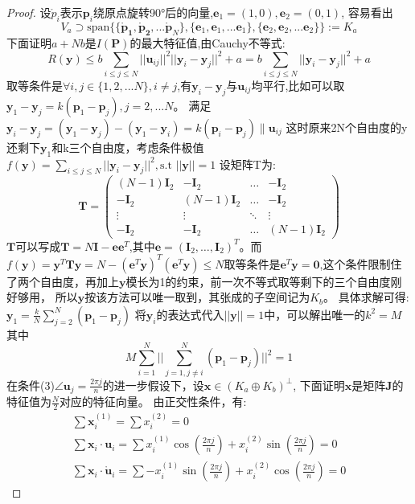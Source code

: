 \begin{proof}
设$\mathring{p}_i$表示$\bm{p}_i$绕原点旋转90°后的向量,$\bm{e}_1=(1,0),\bm{e}_2=(0,1)$,
容易看出
\[
V_a \supset\text{span}\{\{\bm{\mathring{p}_1},\bm{\mathring{p}_2},...\bm{\mathring{p}} _N\},\{\bm{e}_1,\bm{e}_1,...\bm{e}_1\},\{\bm{e}_2,\bm{e}_2,...\bm{e}_2\}\}:=K_a
\]
下面证明$a+Nb$是$I(\bm{P})$的最大特征值,由Cauchy不等式:
\begin{equation}
R(\bm{y})\leq b\sum_{i\leq j\leq N} ||\bm{u}_{ij}||^2||\bm{y}_i-\bm{y}_j||^2+a=b\sum_{i\leq j\leq N}||\bm{y}_i-\bm{y}_j||^2+a
\end{equation}
取等条件是$\forall i,j\in \{1,2,...N\},i\neq j$,有$\bm{y}_i-\bm{y}_j$与$\bm{u}_{ij}$均平行,比如可以取
$\bm{y}_1-\bm{y}_j=k(\bm{p}_1-\bm{p}_j),j=2,...N$。
满足
$\bm{y}_i-\bm{y}_j=(\bm{y}_1-\bm{y}_j)-(\bm{y}_1-\bm{y}_i)
=k(\bm{p}_i-\bm{p}_j)\parallel \bm{u}_{ij}$
这时原来2N个自由度的y还剩下$\bm{y}_1$和k三个自由度，考虑条件极值
$f(\bm{y})=\sum_{i\leq j\leq N} ||\bm{y}_i-\bm{y}_j||^2,\text{s.t } ||\bm{y}||=1$
设矩阵T为:
\[
\bm{T}=\left(
\begin{array}{cccc}
(N-1)\bm{I}_2&-\bm{I}_2&\dots&-\bm{I}_2\\
-\bm{I}_2&(N-1)\bm{I}_2&\dots&-\bm{I}_2\\
\vdots & \vdots & \ddots & \vdots\\
-\bm{I}_2& -\bm{I}_2 & \dots & (N-1)\bm{I}_2
\end{array}
\right)
\]
$\bm{T}$可以写成$\bm{T}=N\bm{I}-\bm{e}\bm{e}^T$,其中$\bm{e}=(\bm{I}_2,\dots,\bm{I}_2)^T$。而$f(\bm{y})=\bm{y}^T\bm{T}\bm{y}=N-(\bm{e}^T\bm{y})^T(\bm{e}^T\bm{y})\leq N$取等条件是$\bm{e}^T\bm{y}=\bm{0}$,这个条件限制住了两个自由度，再加上$\bm{y}$模长为1的约束，前一次不等式取等剩下的三个自由度刚好够用，
所以$\bm{y}$按该方法可以唯一取到，其张成的子空间记为$K_b$。
具体求解可得:
$\bm{y}_1=\frac{k}{N}\sum_{j=2}^N (\bm{p}_1-\bm{p}_j)$
将$\bm{y}_i$的表达式代入$||\bm{y}||=1$中，可以解出唯一的$k^2=M$
其中
\[
M\sum_{i=1}^N||\sum_{j=1,j\neq i}^N(\bm{p}_1-\bm{p}_j)||^2=1
\]
  在条件(3)$\angle\bm{u}_j=\frac{2\pi j}{n}$的进一步假设下，设$\bm{x}\in (K_a\oplus K_b)^{\bot}$,
  下面证明$\bm{x}$是矩阵$\bm{J}$的特征值为$\frac{N}{2}$对应的特征向量。
  由正交性条件，有:
\begin{eqnarray}
\sum \bm{x}_i^{(1)}=\sum x_i^{(2)}=0\\
\sum \bm{x}_i \cdot \bm{u}_i=\sum x_i^{(1)} \cos(\frac{2\pi j}{n})+x_i^{(2)} \sin(\frac{2\pi j}{n}) =0\label{eq:coupling1}\\
\sum \bm{x}_i \cdot \mathring{\bm{u}}_i=\sum -x_i^{(1)} \sin(\frac{2\pi j}{n})+x_i^{(2)} \cos(\frac{2\pi j}{n}) =0\label{eq:coupling2}

\end{eqnarray}
\end{proof}
